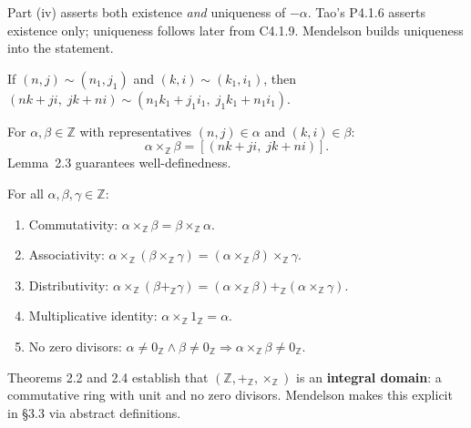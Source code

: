 \begin{remark}
Part (iv) asserts both existence \emph{and} uniqueness of $-\alpha$.
Tao's P4.1.6 asserts existence only; uniqueness follows later from
C4.1.9.  Mendelson builds uniqueness into the statement.
\end{remark}

\begin{lemma}
\label{lem:men-mul-welld}
If $(n,j) \sim (n_1,j_1)$ and $(k,i) \sim (k_1,i_1)$, then
$(nk+ji,\; jk+ni) \sim (n_1k_1+j_1i_1,\; j_1k_1+n_1i_1)$.
\end{lemma}

\begin{tcolorbox}[colback=corbox, colframe=corborder, arc=2pt,
  left=6pt, right=6pt, top=4pt, bottom=4pt,
  title={\small\textbf{Definition 3.4 (Multiplication)}},
  fonttitle=\small\bfseries]
For $\alpha, \beta \in \mathbb{Z}$ with representatives
$(n,j) \in \alpha$ and $(k,i) \in \beta$:
\[
\alpha \times_{\mathbb{Z}} \beta = [(nk+ji,\; jk+ni)].
\]
Lemma~2.3 guarantees well-definedness.
\end{tcolorbox}

\begin{theorem}
\label{thm:men-mul}
For all $\alpha, \beta, \gamma \in \mathbb{Z}$:
\begin{enumerate}
  \item[(i)] Commutativity: $\alpha \times_{\mathbb{Z}} \beta
    = \beta \times_{\mathbb{Z}} \alpha$.
  \item[(ii)] Associativity: $\alpha \times_{\mathbb{Z}}
    (\beta \times_{\mathbb{Z}} \gamma)
    = (\alpha \times_{\mathbb{Z}} \beta) \times_{\mathbb{Z}} \gamma$.
  \item[(iii)] Distributivity: $\alpha \times_{\mathbb{Z}}
    (\beta +_{\mathbb{Z}} \gamma)
    = (\alpha \times_{\mathbb{Z}} \beta)
    +_{\mathbb{Z}} (\alpha \times_{\mathbb{Z}} \gamma)$.
  \item[(iv)] Multiplicative identity: $\alpha \times_{\mathbb{Z}}
    1_{\mathbb{Z}} = \alpha$.
  \item[(v)] No zero divisors: $\alpha \neq 0_{\mathbb{Z}} \wedge
    \beta \neq 0_{\mathbb{Z}} \Rightarrow
    \alpha \times_{\mathbb{Z}} \beta \neq 0_{\mathbb{Z}}$.
\end{enumerate}
\end{theorem}

\begin{remark}
Theorems 2.2 and 2.4 establish that
$(\mathbb{Z}, +_\mathbb{Z}, \times_\mathbb{Z})$ is an
\textbf{integral domain}: a commutative ring with unit and no zero divisors.
Mendelson makes this explicit in \S3.3 via abstract definitions.
\end{remark}

